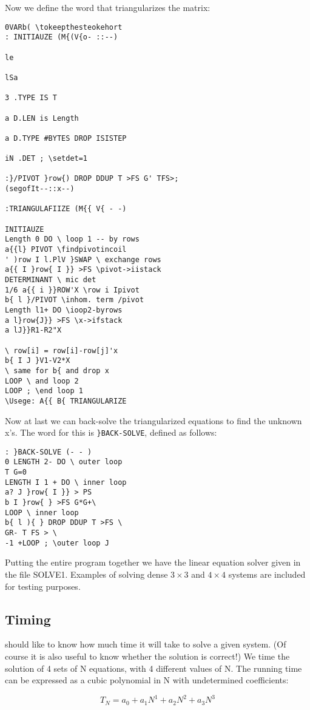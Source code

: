 Now we define the word that triangularizes the matrix:
\begin{verbatim}
0VARb( \tokeepthesteokehort
: INITIAUZE (M{(V{o- ::--)

le

lSa

3 .TYPE IS T

a D.LEN is Length

a D.TYPE #BYTES DROP ISISTEP

iN .DET ; \setdet=1

:}/PIVOT }row{) DROP DDUP T >FS G' TFS>;
(segofIt--::x--)

:TRIANGULAFIIZE (M{{ V{ - -)

INITIAUZE
Length 0 DO \ loop 1 -- by rows
a{{l} PIVOT \findpivotincoil
' )row I l.PlV }SWAP \ exchange rows
a{{ I }row{ I }} >FS \pivot->iistack
DETERMINANT \ mic det
1/6 a{{ i }}ROW'X \row i Ipivot
b{ l }/PIVOT \inhom. term /pivot
Length l1+ DO \ioop2-byrows
a l}row{J}} >FS \x->ifstack
a lJ}}R1-R2"X

\ row[i] = row[i]-row[j]'x
b{ I J }V1-V2*X
\ same for b{ and drop x
LOOP \ and loop 2
LOOP ; \end loop 1
\Usege: A{{ B{ TRIANGULARIZE
\end{verbatim}

Now at last we can back-solve the triangularized equations to find
the unknown x's. The word for this is \verb|}BACK-SOLVE|, defined
as follows:


\begin{verbatim}
: }BACK-SOLVE (- - )
0 LENGTH 2- DO \ outer loop
T G=0
LENGTH I 1 + DO \ inner loop
a? J }row{ I }} > PS
b I }row{ } >FS G*G+\
LOOP \ inner loop
b{ l ){ } DROP DDUP T >FS \
GR- T FS > \
-1 +LOOP ; \outer loop J
\end{verbatim} 

Putting the entire program together we have the linear equation
solver given in the file SOLVE1. Examples of solving dense $3\times 3$
and $4\times 4$ systems are included for testing purposes.

\subsection{Timing}
\TallC{We} should like to know how much time it will take to solve a 
given system. (Of course it is also useful to know whether the
solution is correct!) We time the solution of 4 sets of N equations,
with 4 different values of N. The running time can be expressed
as a cubic polynomial in N with undetermined coefficients:
\addtocounter{equation}{-3} %
\begin{equation}
    T_N=a_0+a_1N^1+a_2N^2+a_3N^3 \label{eq:09_19_}
\end{equation}

